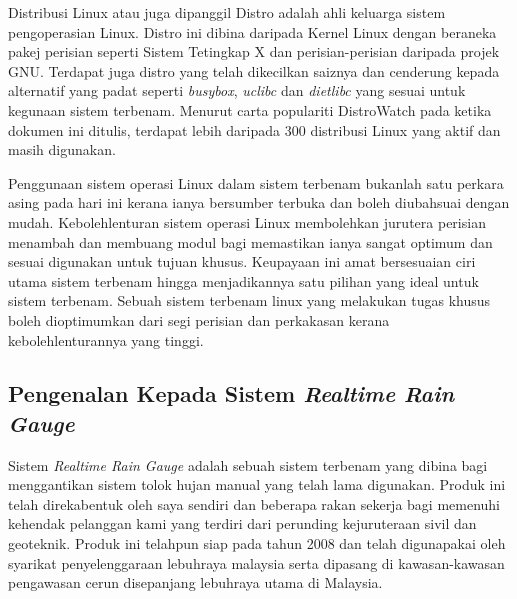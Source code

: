 Distribusi Linux atau juga dipanggil Distro adalah ahli keluarga sistem pengoperasian Linux. Distro ini dibina daripada Kernel Linux dengan beraneka pakej perisian seperti Sistem Tetingkap X dan perisian-perisian daripada projek GNU. Terdapat juga distro yang telah dikecilkan saiznya dan cenderung kepada alternatif yang padat seperti \textit{busybox}, \textit{uclibc} dan \textit{dietlibc} yang sesuai untuk kegunaan sistem terbenam. Menurut carta populariti DistroWatch\cite{w3} pada ketika dokumen ini ditulis, terdapat lebih daripada 300 distribusi Linux yang aktif dan masih digunakan.

Penggunaan sistem operasi Linux dalam sistem terbenam bukanlah satu perkara asing pada hari ini kerana ianya bersumber terbuka dan boleh diubahsuai dengan mudah. Kebolehlenturan sistem operasi Linux membolehkan jurutera perisian menambah dan membuang modul bagi memastikan ianya sangat optimum dan sesuai digunakan untuk tujuan khusus. Keupayaan ini amat bersesuaian ciri utama sistem terbenam hingga menjadikannya satu pilihan yang ideal untuk sistem terbenam. Sebuah sistem terbenam linux yang melakukan tugas khusus boleh dioptimumkan dari segi perisian dan perkakasan kerana kebolehlenturannya yang tinggi.

\subsection{Pengenalan Kepada Sistem \textit{Realtime Rain Gauge}}%
Sistem \textit{Realtime Rain Gauge} adalah sebuah sistem terbenam yang dibina bagi menggantikan sistem tolok hujan manual yang telah lama digunakan. Produk ini telah direkabentuk oleh saya sendiri dan beberapa rakan sekerja bagi memenuhi kehendak pelanggan kami yang terdiri dari perunding kejuruteraan sivil dan geoteknik. Produk ini telahpun siap pada tahun 2008 dan telah digunapakai oleh syarikat penyelenggaraan lebuhraya malaysia serta dipasang di kawasan-kawasan pengawasan cerun disepanjang lebuhraya utama di Malaysia.

